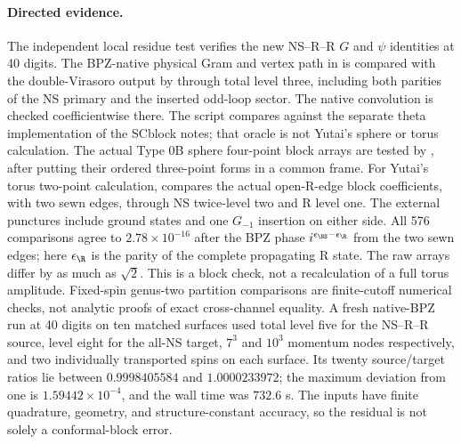 \paragraph{Directed evidence.}
The independent local residue test
 verifies the new
NS--R--R $G$ and $\psi$ identities at 40 digits.  The BPZ-native
physical Gram and vertex path in 
is compared with the double-Virasoro output by
 through total level three,
including both parities of the NS primary and the inserted odd-loop
sector.  The native convolution is checked coefficientwise there.
The script  compares against
the separate theta implementation of the SCblock notes; that oracle
is not Yutai's sphere or torus calculation.  The actual Type 0B
sphere four-point block arrays are tested by
, after putting their
ordered three-point forms in a common frame.  For Yutai's torus
two-point calculation, 
compares the actual open-R-edge block coefficients, with two sewn
edges, through NS twice-level two and R level one.  The external
punctures include ground states and one $G_{-1}$ insertion on either
side.  All 576 comparisons agree to $2.78\times10^{-16}$ after the
BPZ phase $i^{\epsilon_{\NS}-\epsilon_{\R}}$ from the two sewn edges;
here $\epsilon_{\R}$ is the parity of the complete propagating R
state.  The raw
arrays differ by as much as $\sqrt2$.  This is a block check, not a
recalculation of a full torus amplitude.
Fixed-spin genus-two partition comparisons are finite-cutoff numerical
checks, not analytic proofs of exact cross-channel equality.  A fresh
native-BPZ run at 40 digits on ten matched surfaces used total level
five for the NS--R--R source, level eight for the all-NS target,
$7^3$ and $10^3$ momentum nodes respectively, and two individually
transported spins on each surface.  Its twenty source/target ratios
lie between $0.9998405584$ and $1.0000233972$; the maximum deviation
from one is $1.59442\times10^{-4}$, and the wall time was $732.6$ s.
The inputs have finite quadrature, geometry, and structure-constant
accuracy, so the residual is not solely a conformal-block error.
